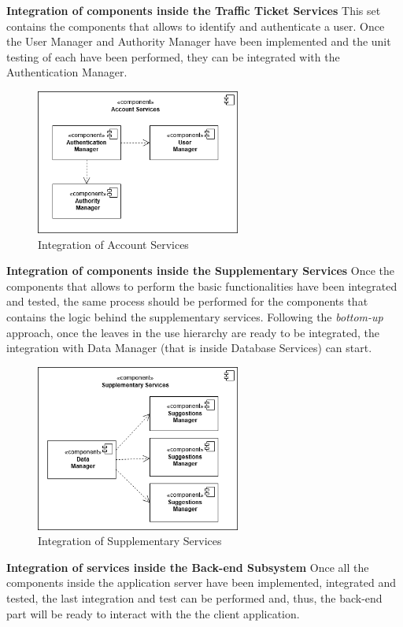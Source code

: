     \noindent\textbf{Integration of components inside the Traffic Ticket Services }\newline
This set contains the components that allows to identify and authenticate a user. Once the User Manager and Authority Manager have been implemented and the unit testing of each have been performed, they can be integrated with the Authentication Manager.
     \begin{figure}[H]
         \centering
          \includegraphics[width=0.6\textwidth]{Images/account_service.png}
        \caption{Integration of Account Services}
    \end{figure}
    \noindent\textbf{Integration of components inside the Supplementary Services }\newline
    Once the components that allows to perform the basic functionalities have been integrated and tested, the same process should be performed for the components that contains the logic behind the supplementary services. Following the \textit{bottom-up} approach, once the leaves in the use hierarchy are ready to be integrated, the integration with Data Manager (that is inside Database Services) can start.
         \begin{figure}[H]
             \centering

          \includegraphics[width=0.6\textwidth]{Images/supplementary_services.png}
        \caption{Integration of Supplementary Services}
    \end{figure}
    \noindent\textbf{Integration of services inside the Back-end Subsystem}\newline
Once all the components inside the application server have been implemented, integrated and tested, the last integration and test can be performed and, thus, the back-end part will be ready to interact with the the client application.
    
